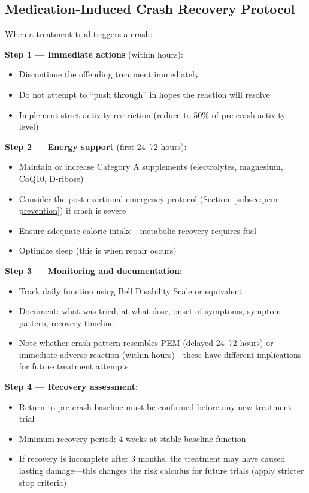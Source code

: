 \subsection{Medication-Induced Crash Recovery Protocol}
\label{subsec:crash-recovery}

When a treatment trial triggers a crash:

\textbf{Step 1 --- Immediate actions} (within hours):
\begin{itemize}
    \item Discontinue the offending treatment immediately
    \item Do not attempt to ``push through'' in hopes the reaction will resolve
    \item Implement strict activity restriction (reduce to 50\% of pre-crash activity level)
\end{itemize}

\textbf{Step 2 --- Energy support} (first 24--72 hours):
\begin{itemize}
    \item Maintain or increase Category A supplements (electrolytes, magnesium, CoQ10, D-ribose)
    \item Consider the post-exertional emergency protocol (Section~\ref{subsec:pem-prevention}) if crash is severe
    \item Ensure adequate caloric intake---metabolic recovery requires fuel
    \item Optimize sleep (this is when repair occurs)
\end{itemize}

\textbf{Step 3 --- Monitoring and documentation}:
\begin{itemize}
    \item Track daily function using Bell Disability Scale or equivalent
    \item Document: what was tried, at what dose, onset of symptoms, symptom pattern, recovery timeline
    \item Note whether crash pattern resembles PEM (delayed 24--72 hours) or immediate adverse reaction (within hours)---these have different implications for future treatment attempts
\end{itemize}

\textbf{Step 4 --- Recovery assessment}:
\begin{itemize}
    \item Return to pre-crash baseline must be confirmed before any new treatment trial
    \item Minimum recovery period: 4 weeks at stable baseline function
    \item If recovery is incomplete after 3 months, the treatment may have caused lasting damage---this changes the risk calculus for future trials (apply stricter stop criteria)
\end{itemize}

